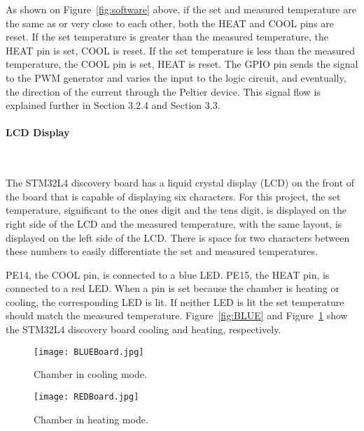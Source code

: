 \documentclass[11pt,letter]{article}
\begin{document}
As shown on Figure~\ref{fig:software} above, if the set and measured temperature are the same as or very close to each other, both the HEAT and COOL pins are reset. If the set temperature is greater than the measured temperature, the HEAT pin is set, COOL is reset. If the set temperature is less than the measured temperature, the COOL pin is set, HEAT is reset. The GPIO pin sends the signal to the PWM generator and varies the input to the logic circuit, and eventually, the direction of the current through the Peltier device. This signal flow is explained further in Section 3.2.4 and Section 3.3.

\paragraph{LCD Display} \

The STM32L4 discovery board has a liquid crystal display (LCD) on the front of the board that is capable of displaying six characters. For this project, the set temperature, significant to the ones digit and the tens digit, is displayed on the right side of the LCD and the measured temperature, with the same layout, is displayed on the left side of the LCD. There is space for two characters between these numbers to easily differentiate the set and measured temperatures.

PE14, the COOL pin, is connected to a blue LED. PE15, the HEAT pin, is connected to a red LED. When a pin is set because the chamber is heating or cooling, the corresponding LED is lit. If neither LED is lit the set temperature should match the measured temperature. Figure~\ref{fig:BLUE} and Figure~\ref{fig:RED} show the STM32L4 discovery board cooling and heating, respectively. 

\begin{figure}[H]
    \centering
    \begin{minipage}{0.5\textwidth}
        \centering
        \texttt{[image: BLUEBoard.jpg]} %
        \caption{Chamber in cooling mode.}
        \label{fig:BLUE}
    \end{minipage}\hfill
    \begin{minipage}{0.5\textwidth}
        \centering
        \texttt{[image: REDBoard.jpg]} %
        \caption{Chamber in heating mode.}
        \label{fig:RED}
    \end{minipage}
\end{figure}
\end{document}
